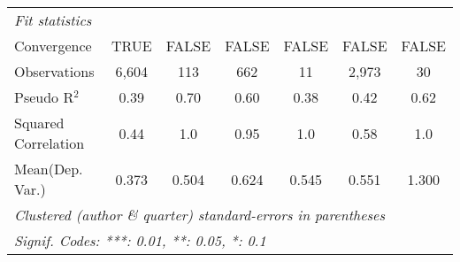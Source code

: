 \begin{tabular}{lcccccc}
   \midrule
   \emph{Fit statistics}\\
   Convergence                                                &TRUE         & FALSE        & FALSE         & FALSE & FALSE         & FALSE\\  
   Observations                                               & 6,604       & 113          & 662           & 11    & 2,973         & 30\\  
   Pseudo R$^2$                                               & 0.39        & 0.70         & 0.60          & 0.38  & 0.42          & 0.62\\  
   Squared Correlation                                        & 0.44        & 1.0          & 0.95          & 1.0   & 0.58          & 1.0\\  
Mean(Dep. Var.) & 0.373 & 0.504 & 0.624 & 0.545 & 0.551 & 1.300 \\
   \midrule \midrule
   \multicolumn{7}{l}{\emph{Clustered (author \& quarter) standard-errors in parentheses}}\\
   \multicolumn{7}{l}{\emph{Signif. Codes: ***: 0.01, **: 0.05, *: 0.1}}\\
\end{tabular}
\par\endgroup
